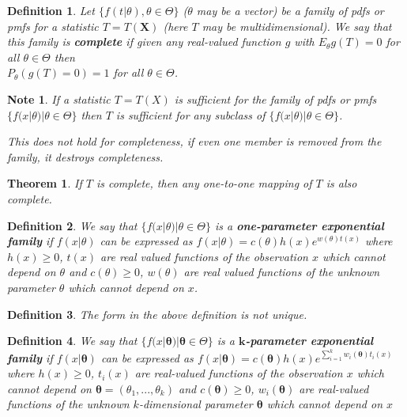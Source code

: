 \documentclass[14pt,twoside]{extreport}
\theoremstyle{dotless}
\newtheorem*{defn}{Definition}
\newtheorem*{thm}{Theorem} %
\newtheorem*{note}{Note} %
\begin{document}
\begin{defn}
    Let $\{ f(t|\theta), \theta \in \Theta \}$ ($\theta$ may be a vector) be a family of pdfs or pmfs for a statistic $T = T(\bm{X})$ (here $T$ may be multidimensional). We say that this family is \textbf{complete} if given any real-valued function $g$ with $E_\theta g(T) = 0$ for all $\theta \in \Theta$ then \\$P_\theta(g(T) = 0) = 1$ for all $\theta \in \Theta$.
\end{defn}

\begin{note}
    If a statistic $T = T(X)$ is sufficient for the family of pdfs or pmfs $\{ f(x|\theta) | \theta \in \Theta \}$ then $T$ is sufficient for any subclass of $\{ f(x|\theta) | \theta \in \Theta \}$. 

    This does not hold for completeness, if even one member is removed from the family, it destroys completeness.
\end{note}

\begin{thm}
    If $T$ is complete, then any one-to-one mapping of $T$ is also complete.
\end{thm}

\begin{defn}
    We say that $\{ f(x|\theta) | \theta \in \Theta \}$ is a \textbf{one-parameter exponential family} if $f(x|\theta)$ can be expressed as $f(x|\theta) = c(\theta) h(x) e^{w(\theta) t(x)}$ where $h(x) \geq 0$, $t(x)$ are real valued functions of the observation $x$ which cannot depend on $\theta$ and $c(\theta) \geq 0$, $w(\theta)$ are real valued functions of the unknown parameter $\theta$ which cannot depend on $x$. 
\end{defn}

\begin{defn}
    The form in the above definition is not unique.
\end{defn}

\begin{defn}
    We say that $\{ f(x|\bm{\theta}) | \bm{\theta} \in \Theta \}$ is a \textbf{$\bm{k}$-parameter exponential family} if $f(x|\bm{\theta})$ can be expressed as $f(x|\bm{\theta}) = c(\bm{\theta}) h(x) e^{\sum_{i=1}^k w_i(\bm{\theta}) t_i(x)}$ where $h(x) \geq 0$, $t_i (x)$ are real-valued functions of the observation $x$ which cannot depend on $\bm{\theta} = (\theta_1, ..., \theta_k)$ and $c(\bm{\theta}) \geq 0$, $w_i(\bm{\theta})$ are real-valued functions of the unknown $k$-dimensional parameter $\bm{\theta}$ which cannot depend on $x$
\end{defn}
\end{document}
